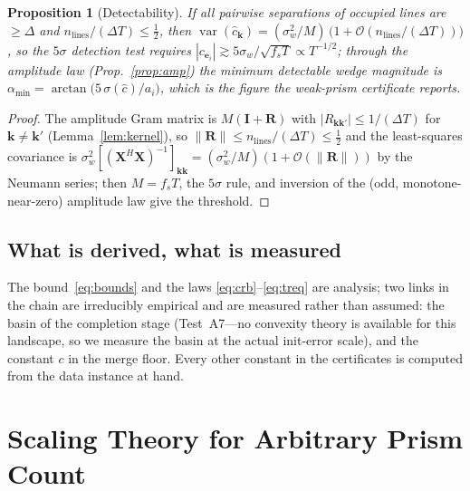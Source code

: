 \documentclass[twocolumn,preprintnumbers,amsmath,amssymb,pra,floatfix]{revtex4-2}
\newcommand{\vect}[1]{\bm{#1}}
\newcommand{\bigO}{\mathcal{O}}
\newtheorem{proposition}{Proposition}
\begin{document}
\begin{proposition}[Detectability]
\label{prop:detect}
If all pairwise separations of occupied lines are $\ge\Delta$ and
$n_{\mathrm{lines}}/(\Delta T)\le\tfrac12$, then
$\operatorname{var}(\hat c_{\vect{k}})
=(\sigma_w^{2}/M)\,\bigl(1+\bigO(n_{\mathrm{lines}}/(\Delta T))\bigr)$,
so the $5\sigma$ detection test requires
$|c_{\vect{e}_i}|\gtrsim 5\sigma_w/\sqrt{f_sT}\propto T^{-1/2}$;
through the amplitude law (Prop.~\ref{prop:amp}) the minimum
detectable wedge magnitude is
$\alpha_{\min}=\arctan\!\bigl(5\,\sigma(\hat c)/a_i\bigr)$, which is
the figure the weak-prism certificate reports.
\end{proposition}
\begin{proof}
The amplitude Gram matrix is $M(\vect{I}+\vect{R})$ with
$|R_{\vect{k}\vect{k}'}|\le1/(\Delta T)$ for $\vect{k}\ne\vect{k}'$
(Lemma~\ref{lem:kernel}), so
$\|\vect{R}\|\le n_{\mathrm{lines}}/(\Delta T)\le\tfrac12$ and the
least-squares covariance is
$\sigma_w^{2}[(\vect{X}^{H}\vect{X})^{-1}]_{\vect{k}\vect{k}}
=(\sigma_w^{2}/M)(1+\bigO(\|\vect{R}\|))$ by the Neumann series; then
$M=f_sT$, the $5\sigma$ rule, and inversion of the (odd,
monotone-near-zero) amplitude law give the threshold.
\end{proof}

\subsection{What is derived, what is measured}
\label{sec:empirical}

The bound~\eqref{eq:bounds} and the laws
\eqref{eq:crb}--\eqref{eq:treq} are analysis; two links in the chain
are irreducibly empirical and are measured rather than assumed: the
basin of the completion stage (Test~A7---no convexity theory is
available for this landscape, so we measure the basin at the actual
init-error scale), and the constant $c$ in the merge floor.  Every
other constant in the certificates is computed from the data instance
at hand.

\section{Scaling Theory for Arbitrary Prism Count}
\label{sec:scaling}
\end{document}

